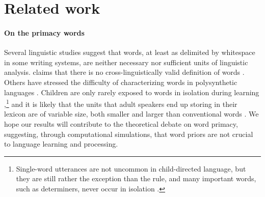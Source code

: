 \section{Related work}
\label{sec:related}

\paragraph{On the primacy words} Several linguistic studies suggest
that words, at least as delimited by whitespace in some writing
systems, are neither necessary nor sufficient units of linguistic
analysis.  claims that there is no
cross-linguistically valid definition of words \cite[see also][who
address specifically the notion of prosodic
word]{Schiering:etal:2010}. Others have stressed the difficulty of
characterizing words in polysynthetic languages
\cite{Bickel:Zuniga:2017}. Children are only rarely exposed to words
in isolation during learning
\cite{Tomasello:2003},\footnote{Single-word utterances are not
  uncommon in child-directed language, but they are still rather the
  exception than the rule, and many important words, such as
  determiners, never occur in isolation
  \cite{Christiansen:etal:2005}.} and it is likely that the units that
adult speakers end up storing in their lexicon are of variable size,
both smaller and larger than conventional words
\cite[e.g.,][]{Jackendoff:2002,Goldberg:2005}. %
We hope our results will contribute to the theoretical
debate on word primacy, suggesting, through computational simulations, that
word priors are not crucial to language learning and processing.

